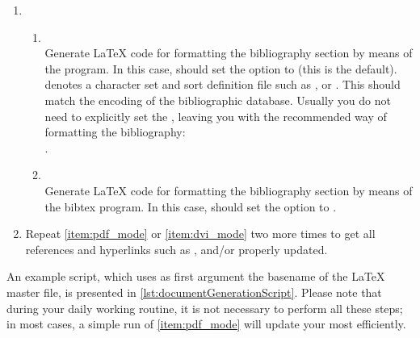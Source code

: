\begin{enumerate}
   \item
   \begin{enumerate}
      \item
         \label{item:bibliographyBT8}
          \\
         Generate \LaTeX{} code for formatting the bibliography section by
         means of the  program.  In this case,
         \latexcmd{\documentclass} should set the
          option to  (this
         is the default).  denotes a \BibTeX{} character
         set and sort definition file such as ,
          or .  This should match the
         encoding of the bibliographic database. Usually you do not need to
         explicitly set the , leaving you with the
         recommended way of formatting the bibliography:\\.
      \item
         \label{item:bibliographyBT}
          \\
         Generate \LaTeX{} code for formatting the bibliography section by
         means of the bibtex program. In this case,
         \latexcmd{\documentclass} should set the
          option to .
   \end{enumerate}

 \item Repeat \autoref{item:pdf_mode} or \autoref{item:dvi_mode} two more
   times to get all references and hyperlinks such as
   \latexcmd{\autoref{}}, \latexcmd{\ac{}} and/or \latexcmd{\textcite{}}
   \ETC{} properly updated.

\end{enumerate}

An example script, which uses as first argument the basename of the
\LaTeX{} master file, is presented in
\autoref{lst:documentGenerationScript}. Please note that during your daily
working routine, it is not necessary to perform all these steps; in most
cases, a simple run of \autoref{item:pdf_mode} will update your
 most efficiently.

